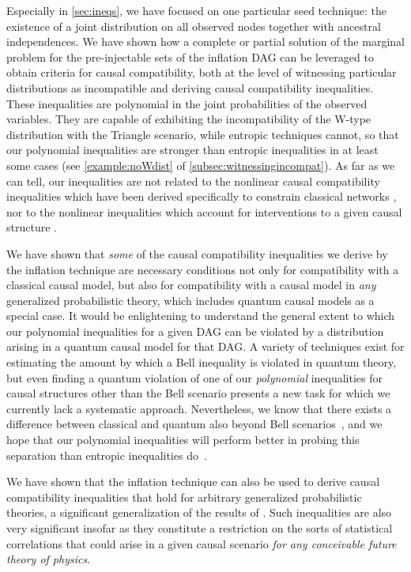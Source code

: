 \documentclass[aps,english,superscriptaddress,onecolumn,twoside,longbibliography,pra,floatfix,fleqn,nofootinbib]{revtex4-1}%
\theoremstyle{definition}
\newcounter{example}[section]
\begin{document}
Especially in \cref{sec:ineqs}, we have focused on one particular seed technique: the existence of a joint distribution on all observed nodes together with ancestral independences. We have shown how a complete or partial solution of the marginal problem for the pre-injectable sets of the inflation DAG can be leveraged to obtain criteria for causal compatibility, both at the level of witnessing particular distributions as incompatible and deriving causal compatibility inequalities. These inequalities are polynomial in the joint probabilities of the observed variables. They are capable of exhibiting the incompatibility of the W-type distribution with the Triangle scenario, while entropic techniques cannot, so that our polynomial inequalities are stronger than entropic inequalities in at least some cases (see \cref{example:noWdist} of \cref{subsec:witnessingincompat}). As far as we can tell, our inequalities are not related to the nonlinear causal compatibility inequalities which have been derived specifically to constrain classical networks \cite{TavakoliStarNetworks,RossetNetworks,TavakoliNoncyclicNetworks}, nor to the nonlinear inequalities which account for interventions to a given causal structure \cite{kang2007polynomialconstraints,steeg2011relaxation}.

We have shown that \emph{some} of the causal compatibility inequalities we derive by the inflation technique are necessary conditions not only for compatibility with a classical causal model, but also for compatibility with a causal model in {\em any} generalized probabilistic theory, which includes quantum causal models as a special case. It would be enlightening to understand the general extent to which our polynomial inequalities for a given DAG can be violated by a distribution arising in a quantum causal model for that DAG. A variety of techniques exist for estimating the amount by which a Bell inequality \cite{NPA2008Long,I3322NPA1} is violated in quantum theory, but even finding a quantum violation of one of our \emph{polynomial} inequalities for causal structures other than the Bell scenario presents a new task for which we currently lack a systematic approach. Nevertheless, we know that there exists a difference between classical and quantum also beyond Bell scenarios~\cite[Theorem~2.16]{fritz2012bell}, and we hope that our polynomial inequalities will perform better in probing this separation than entropic inequalities do~\cite{pusey2014gdag,Chaves2015infoquantum}. 

We have shown that the inflation technique can also be used to derive causal compatibility inequalities that hold for arbitrary generalized probabilistic theories, a significant generalization of the results of \cite{pusey2014gdag}.  Such inequalities are also very significant insofar as they constitute a restriction on the sorts of statistical correlations that could arise in a given causal scenario {\em for any conceivable future theory of physics}.  
\end{document}
